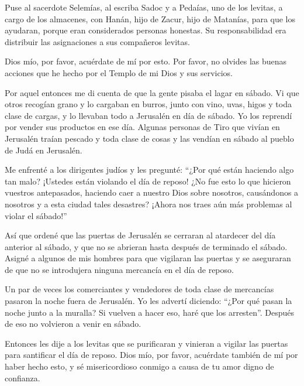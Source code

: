  Puse al sacerdote Selemías, al escriba Sadoc y a Pedaías,
uno de los levitas, a cargo de los almacenes, con Hanán, hijo de Zacur,
hijo de Matanías, para que los ayudaran, porque eran considerados
personas honestas. Su responsabilidad era distribuir las asignaciones a
sus compañeros levitas.

 Dios mío, por favor, acuérdate de mí por esto. Por favor,
no olvides las buenas acciones que he hecho por el Templo de mi Dios y
sus servicios.

 Por aquel entonces me di cuenta de que la gente pisaba el
lagar en sábado. Vi que otros recogían grano y lo cargaban en burros,
junto con vino, uvas, higos y toda clase de cargas, y lo llevaban todo a
Jerusalén en día de sábado.  Yo los reprendí por vender sus
productos en ese día.  Algunas personas de Tiro que vivían
en Jerusalén traían pescado y toda clase de cosas y las vendían en
sábado al pueblo de Judá en Jerusalén.

 Me enfrenté a los dirigentes judíos y les pregunté: ``¿Por
qué están haciendo algo tan malo? ¡Ustedes están violando el día de
reposo! ¿No fue esto lo que hicieron vuestros antepasados, haciendo caer
a nuestro Dios sobre nosotros, causándonos a nosotros y a esta ciudad
tales desastres? ¡Ahora nos traes aún más problemas al violar el
sábado!''

 Así que ordené que las puertas de Jerusalén se cerraran al
atardecer del día anterior al sábado, y que no se abrieran hasta después
de terminado el sábado. Asigné a algunos de mis hombres para que
vigilaran las puertas y se aseguraran de que no se introdujera ninguna
mercancía en el día de reposo.

 Un par de veces los comerciantes y vendedores de toda
clase de mercancías pasaron la noche fuera de Jerusalén. 
Yo les advertí diciendo: ``¿Por qué pasan la noche junto a la muralla?
Si vuelven a hacer eso, haré que los arresten''. Después de eso no
volvieron a venir en sábado.

 Entonces les dije a los levitas que se purificaran y
vinieran a vigilar las puertas para santificar el día de reposo. Dios
mío, por favor, acuérdate también de mí por haber hecho esto, y sé
misericordioso conmigo a causa de tu amor digno de confianza.


